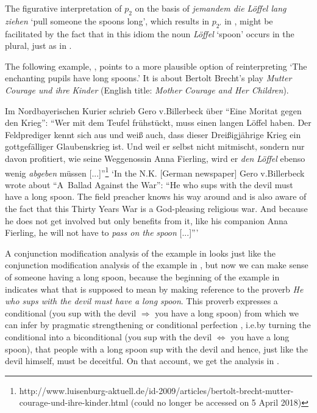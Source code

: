 \documentclass[output=paper]{langsci/langscibook}
\begin{document}
\noindent The figurative interpretation of $p_{2}$ on the basis of \textit{jemandem die Löffel lang ziehen} `pull someone the spoons long', which results in $p_{2'}$ in , might be facilitated by the fact that in this idiom the noun \textit{L\"offel} `spoon' occurs in the plural, just as in . 

The following example, , points to a more plausible option of reinterpreting `The enchanting pupils have long spoons.' It is about Bertolt Brecht's play \textit{Mutter Courage und ihre Kinder} (English title: \textit{Mother Courage and Her Children}).

\ea \label{quoted long spoon}
Im Nordbayerischen Kurier schrieb Gero v.\@ Billerbeck über ``Eine Moritat gegen den Krieg'': ``Wer mit dem Teufel frühstückt, muss einen langen Löffel haben. Der Feldprediger kennt sich aus und weiß auch, dass dieser Dreißigjährige Krieg ein gottgefälliger Glaubenskrieg ist. Und weil er selbst nicht mitmischt, sondern nur davon profitiert, wie seine Wegge\-nos\-sin Anna Fierling, wird er \textit{den} \underline{} \textit{Löffel} ebenso wenig \textit{abgeben} müssen [...]''\footnote{http://www.luisenburg-aktuell.de/id-2009/articles/bertolt-brecht-mutter-courage-und-ihre-kinder.html (could no longer be accessed on 5 April 2018)}
\vspace{5pt}
\glt `In the N.K. [German newspaper] Gero v.\@ Billerbeck wrote about ``\mbox{A Ballad} Against the War'': ``He who sups with the devil must have a long spoon. The field preacher knows his way around and is also aware of the fact that this Thirty Years War is a God-pleasing religious war. And because he does not get involved but only benefits from it, like his companion Anna Fierling, he will not have to \textit{pass on the} \underline{} \textit{spoon} [...]'''
\z

\noindent A conjunction modification analysis of the example in  looks just like the conjunction modification analysis of the example in , but now we can make sense of someone having a long spoon, because the beginning of the example in  indicates what that is supposed to mean by making reference to the proverb \textit{He who sups with the devil must have a long spoon}. This proverb expresses a conditional (you sup with the devil $\Rightarrow$ you have a long spoon) from which we can infer by pragmatic strengthening or conditional perfection \citep[][]{geiszwicky71}, i.e.\@ by turning the conditional into a biconditional (you sup with the devil $\Leftrightarrow$ you have a long spoon), that people with a long spoon sup with the devil and hence, just like the devil himself, must be deceitful. On that account, we get the analysis in .
\end{document}
